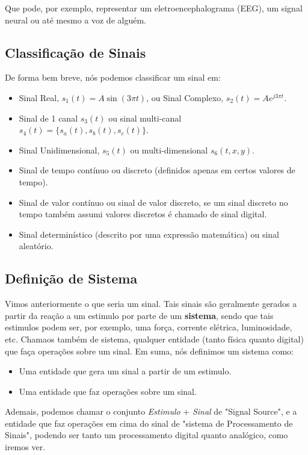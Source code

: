 \documentclass{article}
\begin{document}
Que pode, por exemplo, representar um eletroencephalograma (EEG), um signal neural ou até mesmo a voz de alguém.

\subsection{Classificação de Sinais}
De forma bem breve, nós podemos classificar um sinal em:
\begin{multicols}{2}
    \begin{itemize}
        \item Sinal Real, $s_1(t) = A\sin(3\pi t)$, ou Sinal Complexo, $s_2(t) = Ae^{j3\pi t}$.
        \item Sinal de 1 canal $s_3(t)$ ou sinal multi-canal $s_4(t) = \{s_a(t), s_b(t), s_c(t)\}$.
        \item Sinal Unidimensional, $s_5(t)$ ou multi-dimensional $s_6(t, x, y)$.
        \item Sinal de tempo contínuo ou discreto (definidos apenas em certos valores de tempo).
        \item Sinal de valor contínuo ou sinal de valor discreto, se um sinal discreto no tempo também assumi valores discretos é chamado de sinal digital.
        \item Sinal determinístico (descrito por uma expressão matemática) ou sinal aleatório.
    \end{itemize}
    \end{multicols}
    
\subsection{Definição de Sistema}
Vimos anteriormente o que seria um sinal. Tais sinais são geralmente gerados a partir da reação a um estimulo por parte de um \textbf{sistema}, sendo que tais estimulos podem ser, por exemplo, uma força, corrente elétrica, luminosidade, etc.
Chamaos também de sistema, qualquer entidade (tanto física quanto digital) que faça operações sobre um sinal. 
Em suma, nós definimos um sistema como:
\begin{itemize}
    \item Uma entidade que gera um sinal a partir de um estimulo.
    \item Uma entidade que faz operações sobre um sinal.
\end{itemize}

Ademais, podemos chamar o conjunto \emph{Estimulo} + \emph{Sinal} de "Signal Source", e a entidade que faz operações em cima do sinal de "sistema de Processamento de Sinais", podendo ser tanto um processamento digital quanto analógico, como iremos ver.
\newpage
\end{document}

